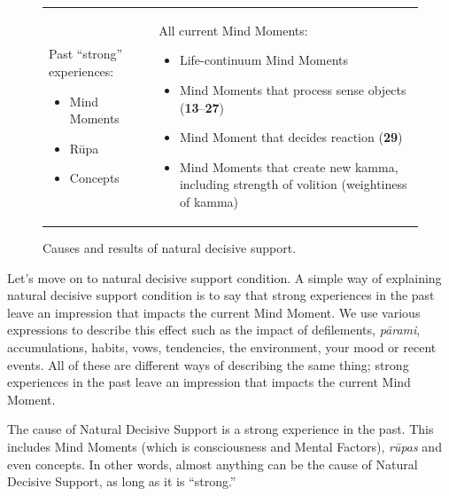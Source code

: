 \begin{figure}[H]
\begin{tabular*}{\textwidth}{L{\tabcolsep} | L{\tabcolsep}}
\toprule
{} &  \\
\midrule

Past “strong” experiences:
\begin{itemize}
\item Mind Moments
\item Rūpa
\item Concepts
\end{itemize}

&
All current Mind Moments:
\begin{itemize}
\item Life-continuum Mind Moments
\item Mind Moments that process sense objects (\textbf{13}--\textbf{27})
\item Mind Moment that decides reaction (\textbf{29})
\item Mind Moments that create new kamma, including strength of volition (weightiness of kamma)\vspace*{-\baselineskip}
\end{itemize}

\\

\bottomrule

\end{tabular*}
\caption{Causes and results of natural decisive support.}
\label{fig:NDS}
\end{figure}

Let’s move on to natural decisive support condition. A simple way of explaining natural decisive support condition is to say that strong experiences in the past leave an impression that impacts the current Mind Moment. We use various expressions to describe this effect such as the impact of defilements, \textit{pārami}, accumulations, habits, vows, tendencies, the environment, your mood or recent events. All of these are different ways of describing the same thing; strong experiences in the past leave an impression that impacts the current Mind Moment.

The cause of Natural Decisive Support is a strong experience in the past. This includes Mind Moments (which is consciousness and Mental Factors), \textit{rūpas} and even concepts. In other words, almost anything can be the cause of Natural Decisive Support, as long as it is “strong.”

